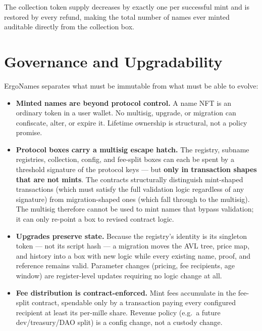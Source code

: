 \documentclass[11pt]{article}
\begin{document}
The collection token supply decreases by exactly one per successful mint and
is restored by every refund, making the total number of names ever minted
auditable directly from the collection box.

\section{Governance and Upgradability}
\label{sec:governance}

ErgoNames separates what must be immutable from what must be able to evolve:

\begin{itemize}
  \item \textbf{Minted names are beyond protocol control.} A name NFT is an
        ordinary token in a user wallet. No multisig, upgrade, or migration
        can confiscate, alter, or expire it. Lifetime ownership is
        structural, not a policy promise.
  \item \textbf{Protocol boxes carry a multisig escape hatch.} The registry,
        subname registries, collection, config, and fee-split boxes can each
        be spent by a threshold signature of the protocol keys --- but
        \textbf{only in transaction shapes that are not mints}. The contracts
        structurally distinguish mint-shaped transactions (which must satisfy
        the full validation logic regardless of any signature) from
        migration-shaped ones (which fall through to the multisig). The
        multisig therefore cannot be used to mint names that bypass
        validation; it can only re-point a box to revised contract logic.
  \item \textbf{Upgrades preserve state.} Because the registry's identity is
        its singleton token --- not its script hash --- a migration moves the
        AVL tree, price map, and history into a box with new logic while
        every existing name, proof, and reference remains valid. Parameter
        changes (pricing, fee recipients, age window) are register-level
        updates requiring no logic change at all.
  \item \textbf{Fee distribution is contract-enforced.} Mint fees accumulate
        in the fee-split contract, spendable only by a transaction paying
        every configured recipient at least its per-mille share. Revenue
        policy (e.g.\ a future dev/treasury/DAO split) is a config change,
        not a custody change.
\end{itemize}
\end{document}
